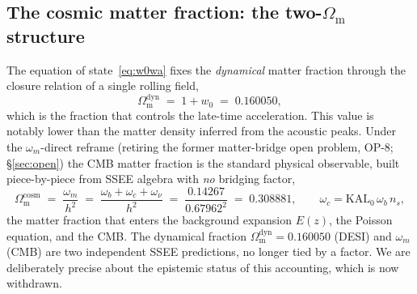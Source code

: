 \documentclass[aps,prd,preprint,amsmath,amssymb,nofootinbib,longbibliography]{revtex4-2}
\newcommand{\Om}{\Omega_{\mathrm{m}}}
\begin{document}
\subsection{The cosmic matter fraction: the two-$\Om$ structure}
\label{sec:two-omega}
The equation of state~\eqref{eq:w0wa} fixes the \emph{dynamical} matter
fraction through the closure relation of a single rolling field,
\begin{equation}
  \Om^{\mathrm{dyn}} \;=\; 1+w_0 \;=\; 0.160050 ,
  \label{eq:omdyn}
\end{equation}
which is the fraction that controls the late-time acceleration. This value is
notably lower than the matter density inferred from the acoustic peaks. Under
the $\omega_m$-direct reframe (retiring the former matter-bridge open problem,
OP-8; \S\ref{sec:open}) the CMB matter fraction is the
standard physical observable, built piece-by-piece from SSEE algebra with
\emph{no} bridging factor,
\begin{equation}
  \Om^{\mathrm{cosm}} \;=\; \frac{\omega_m}{h^2}
        \;=\; \frac{\omega_b+\omega_c+\omega_\nu}{h^2}
        \;=\; \frac{0.14267}{0.67962^2} \;=\; 0.308881 ,
  \qquad \omega_c=\mathrm{KAL_0}\,\omega_b\,n_s ,
  \label{eq:omcosm}
\end{equation}
the matter fraction that enters the background expansion $E(z)$, the Poisson
equation, and the CMB. The dynamical fraction $\Om^{\mathrm{dyn}}=0.160050$ (DESI)
and $\omega_m$ (CMB) are two independent SSEE predictions, no longer tied by a
factor. We are deliberately precise about the epistemic status of this
accounting, which is now withdrawn.
\end{document}
